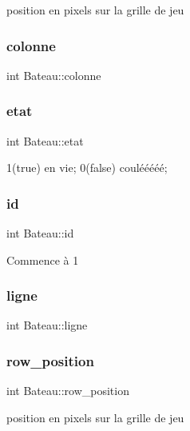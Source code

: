 position en pixels sur la grille de jeu \hypertarget{structBateau_abbe487a77be892bdf087c1b146c957d6}{}\label{structBateau_abbe487a77be892bdf087c1b146c957d6} 
\subsubsection{\texorpdfstring{colonne}{colonne}}
{\footnotesize\ttfamily int Bateau\+::colonne}

\hypertarget{structBateau_a43f12f415c28f4dbd4f28808b9fc1e51}{}\label{structBateau_a43f12f415c28f4dbd4f28808b9fc1e51} 
\subsubsection{\texorpdfstring{etat}{etat}}
{\footnotesize\ttfamily int Bateau\+::etat}

1(true) en vie; 0(false) coulééééé; \hypertarget{structBateau_afc8b5863d722d86e00511dcae976220d}{}\label{structBateau_afc8b5863d722d86e00511dcae976220d} 
\subsubsection{\texorpdfstring{id}{id}}
{\footnotesize\ttfamily int Bateau\+::id}

Commence à 1 \hypertarget{structBateau_ae8d7a76573b9e27c1e72a15832b9d6f3}{}\label{structBateau_ae8d7a76573b9e27c1e72a15832b9d6f3} 
\subsubsection{\texorpdfstring{ligne}{ligne}}
{\footnotesize\ttfamily int Bateau\+::ligne}

\hypertarget{structBateau_a0a2dce9cb58a40ad57f86944daf90bd8}{}\label{structBateau_a0a2dce9cb58a40ad57f86944daf90bd8} 
\subsubsection{\texorpdfstring{row\+\_\+position}{row\_position}}
{\footnotesize\ttfamily int Bateau\+::row\+\_\+position}

position en pixels sur la grille de jeu \hypertarget{structBateau_a887a8ad2ee59ffd987eb5f9d117e83a2}{}\label{structBateau_a887a8ad2ee59ffd987eb5f9d117e83a2} 
